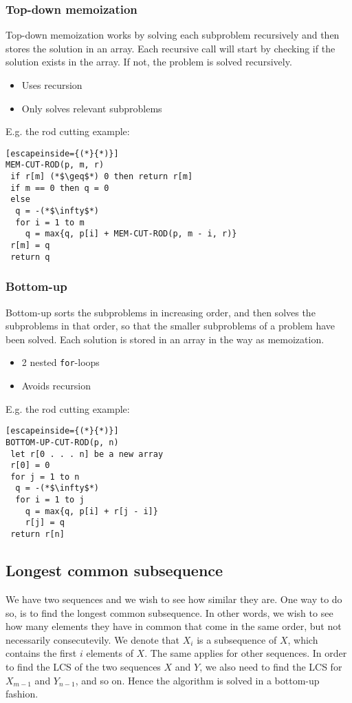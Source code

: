 \subsubsection*{Top-down memoization}
Top-down memoization works by solving each subproblem recursively and then
stores the solution in an array. Each recursive call will start by checking if
the solution exists in the array. If not, the problem is solved recursively.
\begin{itemize}
  \item Uses recursion
  \item Only solves relevant subproblems
\end{itemize}
E.g. the rod cutting example:
\begin{lstlisting}[escapeinside={(*}{*)}]
MEM-CUT-ROD(p, m, r)
 if r[m] (*$\geq$*) 0 then return r[m]
 if m == 0 then q = 0
 else
  q = -(*$\infty$*)
  for i = 1 to m
    q = max{q, p[i] + MEM-CUT-ROD(p, m - i, r)}
 r[m] = q
 return q
\end{lstlisting}
\subsubsection*{Bottom-up}
Bottom-up sorts the subproblems in increasing order, and then solves the
subproblems in that order, so that the smaller subproblems of a problem have
been solved. Each solution is stored in an array in the way as memoization.
\begin{itemize}
  \item 2 nested \texttt{for}-loops
  \item Avoids recursion
\end{itemize}
E.g. the rod cutting example:
\begin{lstlisting}[escapeinside={(*}{*)}]
BOTTOM-UP-CUT-ROD(p, n)
 let r[0 . . . n] be a new array
 r[0] = 0
 for j = 1 to n
  q = -(*$\infty$*)
  for i = 1 to j
    q = max{q, p[i] + r[j - i]}
    r[j] = q
 return r[n]
\end{lstlisting}
\subsection*{Longest common subsequence}
We have two sequences and we wish to see how similar they are. One way to do so,
is to find the longest common subsequence. In other words, we wish to see how
many elements they have in common that come in the same order, but not
necessarily consecutevily.
\newline\newline
We denote that $X_i$ is a subsequence of $X$, which contains the first $i$
elements of $X$. The same applies for other sequences. In order to find the LCS
of the two sequences $X$ and $Y$, we also need to find the LCS for $X_{m-1}$
and $Y_{n-1}$, and so on. Hence the algorithm is solved in a bottom-up fashion.
